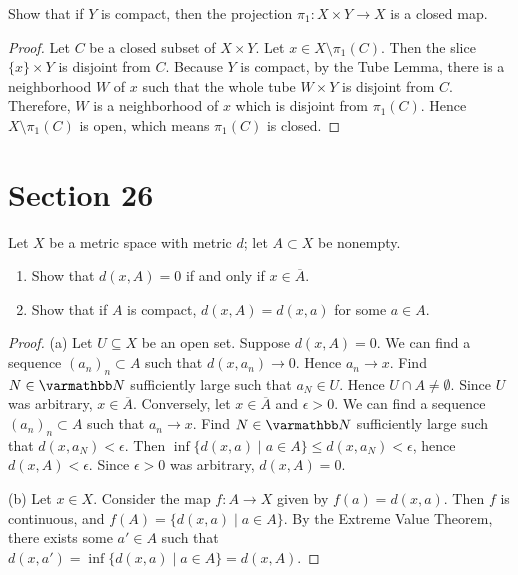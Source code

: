 \documentclass[10pt,oneside,openany]{memoir}
\begin{document}
\begin{exercise}[manual-num={7}]
Show that if $Y$ is compact, then the projection $\pi_1:X \times Y \rightarrow X$ is a closed map.
\end{exercise}
    \begin{proof}
        Let $C$ be a closed subset of $X \times Y$. Let $x \in X \setminus \pi_1(C)$. Then the slice $\{x\} \times Y$ is disjoint from $C$. Because $Y$ is compact, by the Tube Lemma, there is a neighborhood $W$ of $x$ such that the whole tube $W \times Y$ is disjoint from $C$. Therefore, $W$ is a neighborhood of $x$ which is disjoint from $\pi_1(C)$. Hence $X \setminus \pi_1(C)$ is open, which means $\pi_1(C)$ is closed. 
    \end{proof}




\section*{Section 26}
\begin{exercise}[manual-num={2}]
Let $X$ be a metric space with metric $d$; let $A \subset X$ be nonempty.
    \begin{enumerate}[label = (\alph*),itemsep=1pt,topsep=3pt]
        \item Show that $d(x,A) = 0$ if and only if $x \in \overline{A}$.
        \item Show that if $A$ is compact, $d(x,A) = d(x,a)$ for some $a \in A$.
    \end{enumerate}
\end{exercise}
    \begin{proof}
        (a) Let $U \subseteq X$ be an open set. Suppose $d(x,A) = 0$. We can find a sequence $(a_n)_n \subset A$ such that $d(x,a_n) \rightarrow 0$. Hence $a_n \rightarrow x$. Find $N \in \bfN$ sufficiently large such that $a_N \in U$. Hence $U \cap A \neq \emptyset$. Since $U$ was arbitrary, $x \in \overline{A}$. Conversely, let $x \in \overline{A}$ and $\epsilon >0$. We can find a sequence $(a_n)_n \subset A$ such that $a_n \rightarrow x$. Find $N \in \bfN$ sufficiently large such that $d(x, a_N) < \epsilon$. Then $\inf\{d(x,a) \mid a \in A\} \leq d(x,a_N) < \epsilon$, hence $d(x,A) < \epsilon$. Since $\epsilon > 0$ was arbitrary, $d(x,A) = 0$.

        (b) Let $x \in X$. Consider the map $f:A \rightarrow X$ given by $f(a) = d(x,a)$. Then $f$ is continuous, and $f(A) = \{d(x,a) \mid a \in A\}$. By the Extreme Value Theorem, there exists some $a' \in A$ such that $d(x,a') = \inf\{d(x,a) \mid a \in A\} = d(x,A)$.
    \end{proof}
\end{document}
